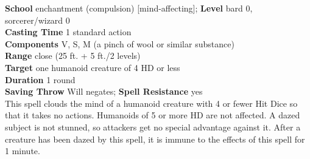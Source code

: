 \textbf{School} enchantment (compulsion) [mind-affecting]; \textbf{Level} bard 0, sorcerer/wizard 0\\
\textbf{Casting Time} 1 standard action\\
\textbf{Components} V, S, M (a pinch of wool or similar substance)\\
\textbf{Range} close (25 ft. + 5 ft./2 levels)\\
\textbf{Target} one humanoid creature of 4 HD or less\\
\textbf{Duration} 1 round\\
\textbf{Saving Throw }Will negates; \textbf{Spell Resistance} yes\\
This spell clouds the mind of a humanoid creature with 4 or fewer Hit Dice so that it takes no actions. Humanoids of 5 or more HD are not affected. A dazed subject is not stunned, so attackers get no special advantage against it. After a creature has been dazed by this spell, it is immune to the effects of this spell for 1 minute.\\
